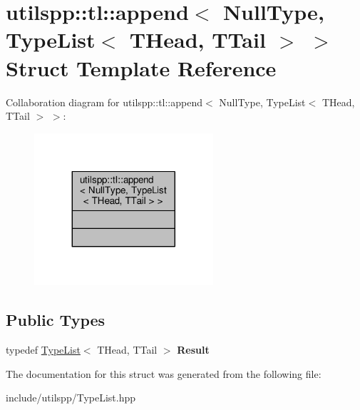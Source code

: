 \hypertarget{structutilspp_1_1tl_1_1append_3_01NullType_00_01TypeList_3_01THead_00_01TTail_01_4_01_4}{\section{utilspp\-:\-:tl\-:\-:append$<$ Null\-Type, Type\-List$<$ T\-Head, T\-Tail $>$ $>$ Struct Template Reference}
\label{structutilspp_1_1tl_1_1append_3_01NullType_00_01TypeList_3_01THead_00_01TTail_01_4_01_4}
}


Collaboration diagram for utilspp\-:\-:tl\-:\-:append$<$ Null\-Type, Type\-List$<$ T\-Head, T\-Tail $>$ $>$\-:
\nopagebreak
\begin{figure}[H]
\begin{center}
\leavevmode
\includegraphics[width=188pt]{structutilspp_1_1tl_1_1append_3_01NullType_00_01TypeList_3_01THead_00_01TTail_01_4_01_4__coll__graph}
\end{center}
\end{figure}
\subsection*{Public Types}
\begin{DoxyCompactItemize}
\item 
\hypertarget{structutilspp_1_1tl_1_1append_3_01NullType_00_01TypeList_3_01THead_00_01TTail_01_4_01_4_a7e2cb7669f70b95cea96a76575ca934c}{typedef \hyperlink{structutilspp_1_1tl_1_1TypeList}{Type\-List}$<$ T\-Head, T\-Tail $>$ {\bfseries Result}}\label{structutilspp_1_1tl_1_1append_3_01NullType_00_01TypeList_3_01THead_00_01TTail_01_4_01_4_a7e2cb7669f70b95cea96a76575ca934c}

\end{DoxyCompactItemize}


The documentation for this struct was generated from the following file\-:\begin{DoxyCompactItemize}
\item 
include/utilspp/Type\-List.\-hpp\end{DoxyCompactItemize}
